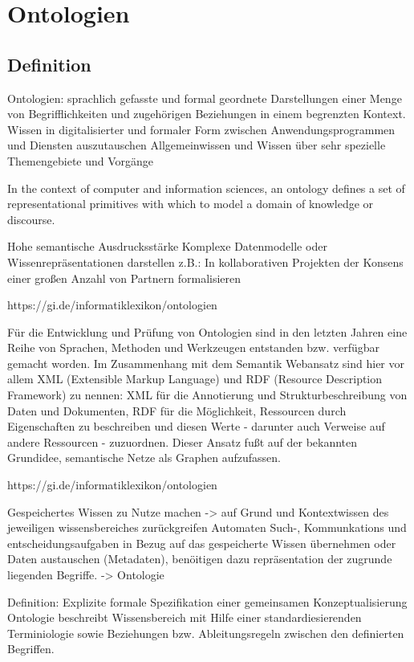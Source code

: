 \chapter{Ontologien}
\section{Definition}
Ontologien: 
	sprachlich gefasste und formal geordnete Darstellungen einer Menge von Begrifflichkeiten und zugehörigen Beziehungen in einem begrenzten Kontext. 
	Wissen in digitalisierter und formaler Form zwischen Anwendungsprogrammen und Diensten auszutauschen
	Allgemeinwissen und Wissen über sehr spezielle Themengebiete und Vorgänge
	
	In the context of computer and information sciences, an ontology defines a set of representational primitives with which to model a domain of knowledge or discourse.
	
	
	Hohe semantische Ausdrucksstärke
		Komplexe Datenmodelle oder Wissenrepräsentationen darstellen
		z.B.: In kollaborativen Projekten der Konsens einer großen Anzahl von Partnern formalisieren
		

		https://gi.de/informatiklexikon/ontologien

		Für die Entwicklung und Prüfung von Ontologien sind in den letzten Jahren eine Reihe von Sprachen, Methoden und Werkzeugen entstanden bzw. verfügbar gemacht worden. Im Zusammenhang mit dem Semantik Webansatz sind hier vor allem XML (Extensible Markup Language) und RDF (Resource Description Framework) zu nennen: XML für die Annotierung und Strukturbeschreibung von Daten und Dokumenten, RDF für die Möglichkeit, Ressourcen durch Eigenschaften zu beschreiben und diesen Werte - darunter auch Verweise auf andere Ressourcen - zuzuordnen. Dieser Ansatz fußt auf der bekannten Grundidee, semantische Netze als Graphen aufzufassen.


https://gi.de/informatiklexikon/ontologien

	Gespeichertes Wissen zu Nutze machen -> auf Grund und Kontextwissen des jeweiligen wissensbereiches zurückgreifen
	Automaten Such-, Kommunkations und entscheidungsaufgaben in Bezug auf das gespeicherte Wissen übernehmen oder Daten austauschen (Metadaten), benöitigen dazu repräsentation der zugrunde liegenden Begriffe. -> Ontologie

	Definition: Explizite formale Spezifikation einer gemeinsamen Konzeptualisierung
	Ontologie beschreibt Wissensbereich mit Hilfe einer standardiesierenden Terminiologie sowie Beziehungen bzw. Ableitungsregeln zwischen den definierten Begriffen. 

